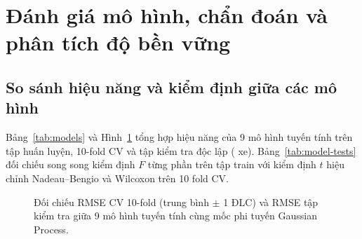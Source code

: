 \section{Đánh giá mô hình, chẩn đoán và phân tích độ bền vững}
\label{sec:eval}

\subsection{So sánh hiệu năng và kiểm định giữa các mô hình}
Bảng~\ref{tab:models} và Hình~\ref{fig:models} tổng hợp hiệu năng của 9 mô hình tuyến tính trên tập huấn luyện, 10-fold CV và tập kiểm tra độc lập (\nTest{} xe). Bảng~\ref{tab:model-tests} đối chiếu song song kiểm định $F$ từng phần trên tập train với kiểm định $t$ hiệu chỉnh Nadeau--Bengio và Wilcoxon trên 10 fold CV.

\begin{table}[htbp]
  \centering
  \caption{Hiệu năng 9 mô hình hồi quy tuyến tính trên tập train (\nTrain{} xe), 10-fold CV và tập test (\nTest{} xe). Đơn vị RMSE, MAE, MedAE: g/km.}
  \label{tab:models}
  \footnotesize
  \setlength{\tabcolsep}{3.6pt}
  
\end{table}

\begin{figure}[htbp]
  \centering
  
  \caption{Đối chiếu RMSE CV 10-fold (trung bình $\pm$ 1 ĐLC) và RMSE tập kiểm tra giữa 9 mô hình tuyến tính cùng mốc phi tuyến Gaussian Process.}
  \label{fig:models}
\end{figure}

\begin{table}[htbp]
  \centering
  \caption{Kiểm định so sánh mô hình: $F$ từng phần trên tập huấn luyện và kiểm định $t$ hiệu chỉnh Nadeau--Bengio (df $= 9$), Wilcoxon trên 10 fold CV ($\overline{\Delta\text{RMSE}} < 0$: mô hình sau có RMSE nhỏ hơn).}
  \label{tab:model-tests}
  \small
  \setlength{\tabcolsep}{4.5pt}
  
\end{table}

